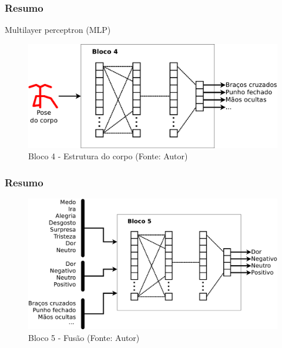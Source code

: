 \begin{frame}
\frametitle{Resumo}
Multilayer perceptron (MLP)
\begin{figure}[h!]
\centering
\includegraphics[width=0.75\linewidth]{images/body-struct.eps}
\caption{Bloco 4 - Estrutura do corpo (Fonte: Autor)}
\label{fig:bloco4}
\end{figure} 
\end{frame}


\begin{frame}
\frametitle{Resumo}
\begin{figure}[h!]
\centering
\includegraphics[width=0.95\linewidth]{images/body-fusion.eps}
\caption{Bloco 5 - Fusão (Fonte: Autor)}
\label{fig:bloco5}
\end{figure} 
\end{frame}

